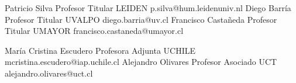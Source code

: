 





\begin{referees}
		{Patricio Silva}
		{Profesor Titular}
		{LEIDEN}
		{p.silva@hum.leidenuniv.nl}
		{Diego Barría}
		{Profesor Titular}
		{UVALPO}
		{diego.barria@uv.cl}
		{Francisco Castañeda}
		{Profesor Titular}
		{UMAYOR}
		{francisco.castaneda@umayor.cl}
\end{referees}

\begin{referees}
		{María Cristina Escudero}
		{Profesora Adjunta}
		{UCHILE}
		{mcristina.escudero@iap.uchile.cl}
		{Alejandro Olivares}
		{Profesor Asociado}
		{UCT}
		{alejandro.olivares@uct.cl}
\end{referees}